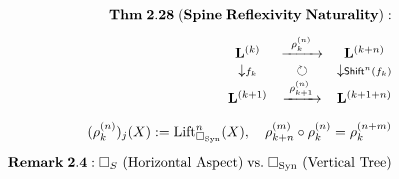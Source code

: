 \documentclass[preview]{standalone}
\begin{document}
\begin{align*}
\special{dvisvgm:raw <g id='unique000'>}\mathbf{Thm\;2.28\;(Spine\;Reflexivity\;Naturality):}\\[4pt]\begin{matrix} \mathbf{L}^{(k)} & \xrightarrow{\;\;\rho_k^{(n)}\;\;} & \mathbf{L}^{(k+n)} \\ \downarrow\scriptstyle f_k & \circlearrowright & \downarrow\scriptstyle \mathsf{Shift}^n(f_k) \\ \mathbf{L}^{(k+1)} & \xrightarrow{\;\rho_{k+1}^{(n)}\;} & \mathbf{L}^{(k+1+n)} \end{matrix}\\[6pt](\rho_k^{(n)})_j(X) := \operatorname{Lift}_{\Box_{\text{Syn}}}^n(X), \quad \rho_{k+n}^{(m)}\circ\rho_k^{(n)} = \rho_k^{(n+m)}\\[5pt]\mathbf{Remark\;2.4:}\;\Box_S\text{ (Horizontal Aspect)} \;\text{vs.}\; \Box_{\text{Syn}}\text{ (Vertical Tree)}\special{dvisvgm:raw </g>}
\end{align*}
\end{document}
